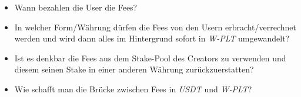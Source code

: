 \vspace{1.0cm}


\vspace{0.3cm}

\begin{itemize}
	\item Wann bezahlen die User die Fees?
	\item In welcher Form/Währung dürfen die Fees von den Usern erbracht/verrechnet werden und wird dann alles im Hintergrund sofort in \textit{W-PLT} umgewandelt?
	\item Ist es denkbar die Fees aus dem Stake-Pool des Creators zu verwenden und diesem seinen Stake in einer anderen Währung zurückzuerstatten?
	\item Wie schafft man die Brücke zwischen Fees in \textit{USDT} und \textit{W-PLT}?
\end{itemize}


\newpage

